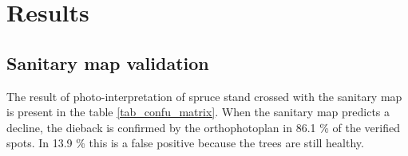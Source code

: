 \documentclass[3p,procedia]{elsarticle}
\begin{document}

















\section{Results}


\subsection{Sanitary map validation}
The result of photo-interpretation of spruce stand crossed with the sanitary map is present in the table \ref{tab_confu_matrix}. 
When the sanitary map predicts a decline, the dieback is confirmed by the orthophotoplan in 86.1 \% of the verified spots.
In 13.9 \% this is a false positive because the trees are still healthy.
  
\end{document}
